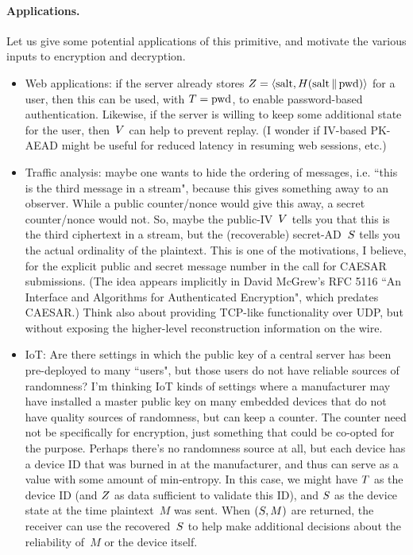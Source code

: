 \paragraph{Applications. }
Let us give some potential applications of this primitive, and motivate the various inputs to encryption and decryption.
\begin{itemize}
\item Web applications: if the server already stores $Z=\langle \mathrm{salt},H(\mathrm{salt}\,\|\, \mathrm{pwd})\rangle$ for a user, then this can be used, with $T=\mathrm{pwd}$, to enable password-based authentication.  Likewise, if the server is willing to keep some additional state for the user, then~$V$ can help to prevent replay.  (I wonder if IV-based PK-AEAD might be useful for reduced latency in resuming web sessions, etc.)
%
\item Traffic analysis: maybe one wants to hide the ordering of messages, i.e. ``this is the third message in a stream", because this gives something away to an observer.  While a public counter/nonce would give this away, a secret counter/nonce would not.  So, maybe the public-IV~$V$ tells you that this is the third ciphertext in a stream, but the (recoverable) secret-AD~$S$ tells you the actual ordinality of the plaintext.  This is one of the motivations, I believe, for the explicit public and secret message number in the call for CAESAR submissions.  (The idea appears implicitly in David McGrew's RFC 5116 ``An Interface and Algorithms for Authenticated Encryption", which predates CAESAR.)  Think also about providing TCP-like functionality over UDP, but without exposing the higher-level reconstruction information on the wire.
%
\item IoT: Are there settings in which the public key of a central server has been pre-deployed to many ``users", but those users do not have reliable sources of randomness? I'm thinking IoT kinds of settings where a manufacturer may have installed a master public key on many embedded devices that do not have quality sources of randomness, but can keep a counter.  The counter need not be specifically for encryption, just something that could be co-opted for the purpose.  Perhaps there's no randomness source at all, but each device has a device ID that was burned in at the manufacturer, and thus can serve as a value with some amount of min-entropy.  In this case, we might have $T$ as the device ID (and $Z$ as data sufficient to validate this ID), and $S$ as the device state at the time plaintext~$M$ was sent.  When $(S,M)$ are returned, the receiver can use the recovered~$S$ to help make additional decisions about the reliability of~$M$ or the device itself.

\end{itemize}
